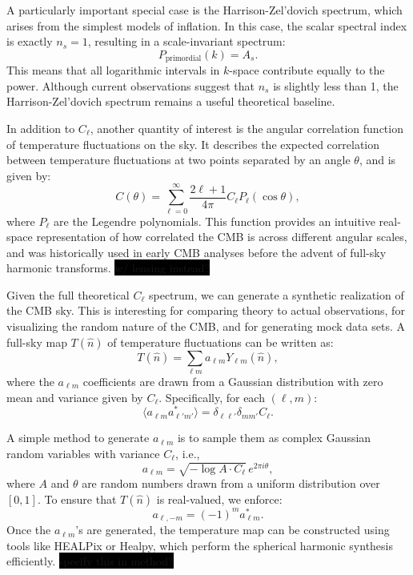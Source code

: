 \documentclass{aa}
\numberwithin{equation}{section}
\numberwithin{table}{section}
\numberwithin{figure}{section}
\begin{document}
A particularly important special case is the Harrison-Zel'dovich spectrum, which arises from the simplest models of inflation. In this case, the scalar spectral index is exactly $n_s = 1$, resulting in a scale-invariant spectrum:
\begin{equation}
    P_{\text{primordial}}(k) = A_s.
\end{equation}
This means that all logarithmic intervals in $k$-space contribute equally to the power. Although current observations suggest that $n_s$ is slightly less than 1, the Harrison-Zel'dovich spectrum remains a useful theoretical baseline.

In addition to $C_\ell$, another quantity of interest is the angular correlation function of temperature fluctuations on the sky. It describes the expected correlation between temperature fluctuations at two points separated by an angle $\theta$, and is given by:
\begin{equation}
    C(\theta) = \sum_{\ell = 0}^{\infty} \frac{2\ell + 1}{4\pi} C_\ell P_\ell(\cos\theta),
\end{equation}
where $P_\ell$ are the Legendre polynomials. This function provides an intuitive real-space representation of how correlated the CMB is across different angular scales, and was historically used in early CMB analyses before the advent of full-sky harmonic transforms. \colorbox{black}{w/ lensing instead?}

Given the full theoretical $C_\ell$ spectrum, we can generate a synthetic realization of the CMB sky. This is interesting for comparing theory to actual observations, for visualizing the random nature of the CMB, and for generating mock data sets. A full-sky map $T(\hat{n})$ of temperature fluctuations can be written as:
\begin{equation}
    T(\hat{n}) = \sum_{\ell m} a_{\ell m} Y_{\ell m}(\hat{n}),
\end{equation}
where the $a_{\ell m}$ coefficients are drawn from a Gaussian distribution with zero mean and variance given by $C_\ell$. Specifically, for each $(\ell, m)$:
\begin{equation}
    \langle a_{\ell m} a_{\ell' m'}^* \rangle = \delta_{\ell \ell'} \delta_{m m'} C_\ell.
\end{equation}

A simple method to generate $a_{\ell m}$ is to sample them as complex Gaussian random variables with variance $C_\ell$, i.e.,
\begin{equation}
    a_{\ell m} = \sqrt{-\log A \cdot C_\ell} \, e^{2\pi i \theta},
\end{equation}
where $A$ and $\theta$ are random numbers drawn from a uniform distribution over $[0,1]$. To ensure that $T(\hat{n})$ is real-valued, we enforce:
\begin{equation}
    a_{\ell, -m} = (-1)^m a_{\ell m}^*.
\end{equation}
Once the $a_{\ell m}$'s are generated, the temperature map can be constructed using tools like HEALPix or Healpy, which perform the spherical harmonic synthesis efficiently. \colorbox{black}{specify this in method?}
\color{black}
\end{document}
